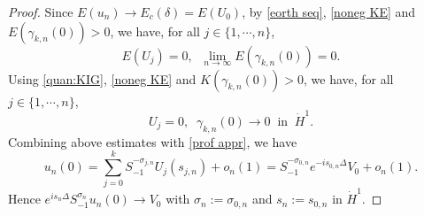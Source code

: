 \documentclass[reqno, 11pt]{amsart}
\numberwithin{equation}{section}
\theoremstyle{plain}
\theoremstyle{definition}
\numberwithin{equation}{section}
\numberwithin{theorem}{section}
\numberwithin{equation}{section}
\numberwithin{equation}{section}
\numberwithin{theorem}{section}
\begin{document}
\begin{proof}
		Since $E(u_n)\rightarrow E_c(\delta)=E(U_0)$, by \eqref{eorth seq}, \eqref{noneg KE} and $E(\gamma_{k,n}(0))>0$, we have, for all $j\in\{1,\cdots,n\}$,
		\begin{equation*}
		E(U_j)=0,\;\;\lim_{n \to \infty}E(\gamma_{k,n}(0))=0.
		\end{equation*}
		Using \eqref{quan:KIG}, \eqref{noneg KE} and $K(\gamma_{k,n}(0))>0$, we have, for all $j\in\{1,\cdots,n\}$,
		\begin{equation*}
		U_j=0,\;\;\gamma_{k,n}(0)\rightarrow0\;\;\text{in}\;\;\dot H^1.
		\end{equation*}
		Combining above estimates with \eqref{prof appr}, we have
		\begin{equation*}
		u_n(0)=\sum_{j=0}^k S_{-1}^{-\sigma_{j,n}}U_j(s_{j,n}) +o_n(1)  =S_{-1}^{-\sigma_{0,n}}e^{-is_{0,n}\Delta}V_0 +o_n(1).
		\end{equation*}
		Hence $e^{is_n\Delta}S_{-1}^{\sigma_n}u_n(0)\rightarrow V_0$ with $\sigma_n:=\sigma_{0,n}$ and $s_n:=s_{0,n}$ in $\dot H^1$.
	\end{proof}
	
\end{document}
